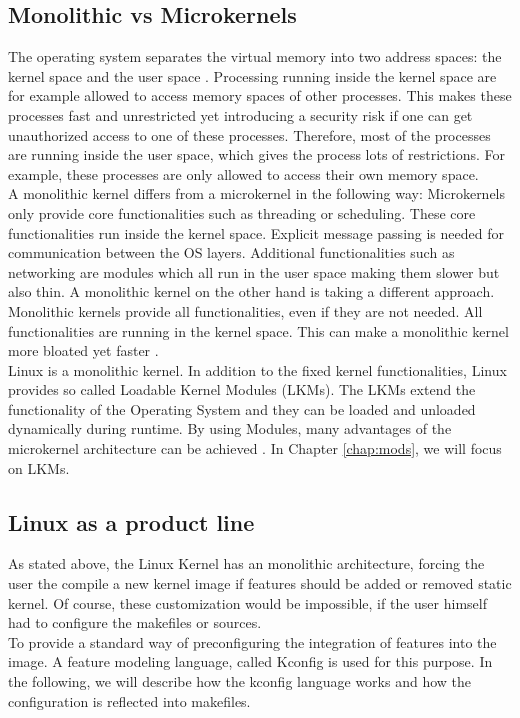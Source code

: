 \documentclass{sig-alternate-05-2015}
\begin{document}
\subsection{Monolithic vs Microkernels}
 The operating system separates the virtual memory into two address spaces: the kernel space and the user space \cite{stankov2006discussion}. Processing running inside the kernel space are for example allowed to access memory spaces of other processes. This makes these processes fast and unrestricted yet introducing a security risk if one can get unauthorized access to one of these processes. Therefore, most of the processes are running inside the user space, which gives the process lots of restrictions. For example, these processes are only allowed to access their own memory space. \\ A monolithic kernel differs from a microkernel in the following way: Microkernels only provide core functionalities such as threading or scheduling.  These core functionalities run inside the kernel space. Explicit message passing is needed for communication between the OS layers. Additional functionalities such as networking are  modules which all run in the user space making them slower but also thin.  A monolithic kernel on the other hand is taking a different approach. Monolithic kernels provide all functionalities, even if they are not needed. All functionalities are running in the kernel space. This can make a monolithic kernel more bloated yet faster . \\
Linux is a monolithic kernel. In addition to the fixed kernel functionalities, Linux provides so called Loadable Kernel Modules (LKMs). The LKMs extend the functionality of the Operating System and they can be loaded and unloaded dynamically during runtime. By using Modules,  many advantages of the microkernel architecture can be achieved \cite[pp. 11]{bovet2005understanding}. In Chapter \ref{chap:mods}, we will focus on LKMs. \\


\subsection{Linux as a product line}
As stated above, the Linux Kernel has an monolithic architecture, forcing the user the compile a new kernel image if features should be added or removed static kernel. Of course, these customization would be impossible, if the user himself had to configure the makefiles or sources.\\
To provide a standard way of preconfiguring the integration of features into the image. A feature modeling language, called Kconfig \cite{kconfig} is used for this purpose. In the following, we will describe how the kconfig language works and how the configuration is reflected into makefiles.
\end{document}

